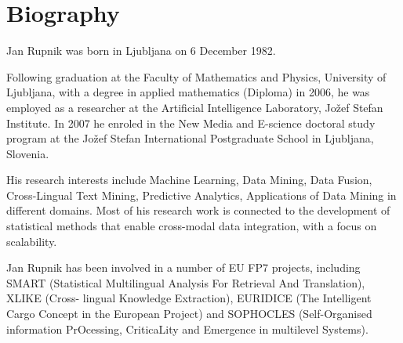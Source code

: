 %
\chapter{Biography}

Jan Rupnik was born in Ljubljana on 6 December 1982.

Following graduation at the Faculty of Mathematics and Physics, University of Ljubljana,
with a degree in applied mathematics (Diploma) in 2006, he was employed as a researcher
at the Artificial Intelligence Laboratory, Jožef Stefan Institute. In 2007 he
enroled in the New Media and E-science doctoral study program at the Jožef Stefan
International Postgraduate School in Ljubljana, Slovenia.

His research interests include Machine Learning, Data Mining, Data
Fusion, Cross-Lingual Text Mining, Predictive Analytics, Applications of Data Mining
in different domains. Most of his research work is connected to the development of
statistical methods that enable cross-modal data integration, with a focus on
scalability.

Jan Rupnik has been involved in a number of EU FP7 projects, including
SMART (Statistical Multilingual Analysis For Retrieval And Translation), XLIKE (Cross-
lingual Knowledge Extraction), EURIDICE (The Intelligent Cargo Concept in the
European Project) and SOPHOCLES (Self-Organised information PrOcessing,
CriticaLity and Emergence in multilevel Systems). 